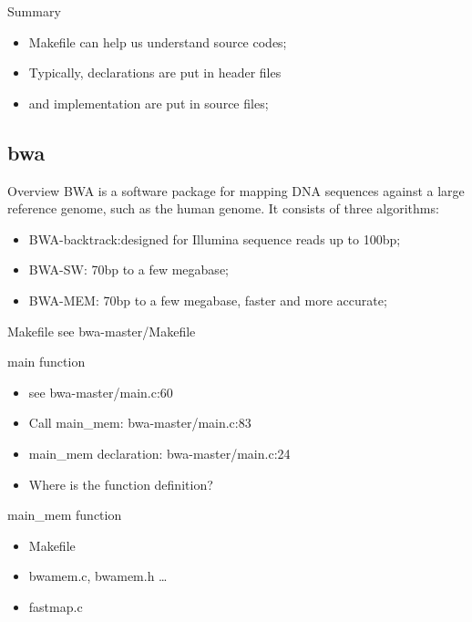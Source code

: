 \documentclass[UTF8]{beamer}
\begin{document}
\begin{frame}[t]{Summary}
  \begin{itemize}
    \item Makefile can help us understand source codes;
    \item Typically, declarations are put in header files
    \item and implementation are put in source files;
  \end{itemize}
\end{frame}

\subsection{bwa}
\begin{frame}[t]{Overview}
BWA is a software package for mapping DNA sequences against a large reference
genome, such as the human genome. It consists of three algorithms:
\begin{itemize}
\item BWA-backtrack:designed for Illumina sequence reads up to 100bp;
\item BWA-SW: 70bp to a few megabase;
\item BWA-MEM: 70bp to a few megabase, faster and more accurate;
\end{itemize}
\end{frame}


\begin{frame}[t]{Makefile}
  see bwa-master/Makefile
\end{frame}

\begin{frame}[t]{main function}
  \begin{itemize}
    \item see bwa-master/main.c:60
    \item Call main_mem: bwa-master/main.c:83
    \item main_mem declaration: bwa-master/main.c:24
    \pause\item Where is the function definition?
  \end{itemize}

\end{frame}

\begin{frame}[t]{main_mem function}
\begin{itemize}
  \item Makefile
  \item bwamem.c, bwamem.h \ldots
  \pause \item fastmap.c
\end{itemize}
\end{frame}
\end{document}
